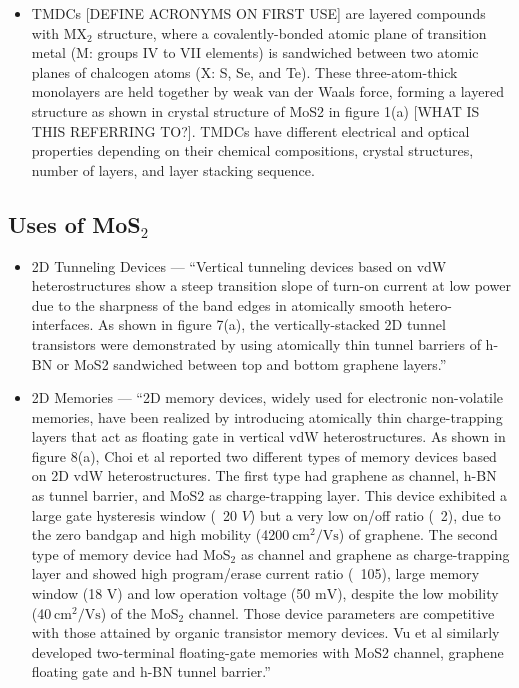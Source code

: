 \documentclass[conference]{IEEEtran}
\begin{document}
\begin{itemize}

  \item  TMDCs [DEFINE ACRONYMS ON FIRST USE] are layered compounds with MX$_2$ structure, where a covalently-bonded atomic plane of transition metal (M: groups IV to VII elements) is sandwiched between two atomic planes of chalcogen atoms (X: S, Se, and Te). These three-atom-thick monolayers are held together by weak van der Waals force, forming a layered structure as shown in crystal structure of MoS2 in figure 1(a) [WHAT IS THIS REFERRING TO?]. TMDCs have different electrical and optical properties depending on their chemical compositions, crystal structures, number of layers, and layer stacking sequence. 

\end{itemize}

\subsection{Uses of MoS$_2$}

\begin{itemize}

  \item 2D Tunneling Devices — ``Vertical tunneling devices based on vdW heterostructures show a steep transition slope of turn-on current at low power due to the sharpness of the band edges in atomically smooth hetero-interfaces. As shown in figure 7(a), the vertically-stacked 2D tunnel transistors were demonstrated by using atomically thin tunnel barriers of h-BN or MoS2 sandwiched between top and bottom graphene layers.''

  \item 2D Memories — ``2D memory devices, widely used for electronic non-volatile memories, have been realized by introducing atomically thin charge-trapping layers that act as floating gate in vertical vdW heterostructures. As shown in figure 8(a), Choi et al reported two different types of memory devices based on 2D vdW heterostructures. The first type had graphene as channel, h-BN as tunnel barrier, and MoS2 as charge-trapping layer. This device exhibited a large gate hysteresis window (~20 $\si{V}$) but a very low on/off ratio (~2), due to the zero bandgap and high mobility (4200 $\si{\centi\meter\squared\per\volt\second}$) of graphene. The second type of memory device had MoS$_2$ as channel and graphene as charge-trapping layer and showed high program/erase current ratio (~105), large memory window (18 $\si{\volt}$) and low operation voltage (50 $\si{\milli\volt}$), despite the low mobility (40 $\si{\centi\meter\squared\per\volt\second}$) of the MoS$_2$ channel. Those device parameters are competitive with those attained by organic transistor memory devices. Vu et al similarly developed two-terminal floating-gate memories with MoS2 channel, graphene floating gate and h-BN tunnel barrier.''

\end{itemize}
\end{document}
